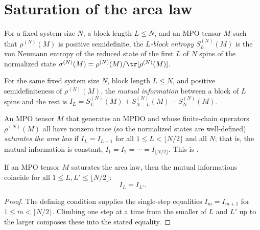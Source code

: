 \section{Saturation of the area law}

\begin{definition}\label{def:block_entropy}
    \leanok
    For a fixed system size $N$, a block length $L\le N$, and an MPO tensor $M$
    such that $\rho^{(N)}(M)$ is positive semidefinite, the \emph{$L$-block entropy}
    $S_L^{(N)}(M)$ is the von Neumann entropy of the reduced state of the first
    $L$ of $N$ spins of the normalized state
    $\sigma^{(N)}(M) = \rho^{(N)}(M) / \tr[\rho^{(N)}(M)]$.
\end{definition}

\begin{definition}\label{def:mutual_info_chain}
    \leanok
    For the same fixed system size $N$, block length $L\le N$, and positive
    semidefiniteness of $\rho^{(N)}(M)$, the \emph{mutual information} between
    a block of $L$ spins and the rest is
    $I_L = S_L^{(N)}(M) + S_{N-L}^{(N)}(M) - S_N^{(N)}(M)$.
\end{definition}

\begin{definition}\label{def:is_sal}
    \leanok
    An MPO tensor $M$ that generates an MPDO and whose finite-chain operators
    $\rho^{(N)}(M)$ all have nonzero trace (so the normalized states are
    well-defined) \emph{saturates the area law} if
    $I_L = I_{L+1}$ for all $1 \le L < \lfloor N/2 \rfloor$ and all $N$; that is,
    the mutual information is constant, $I_1 = I_2 = \cdots = I_{\lfloor N/2 \rfloor}$.
    This is \cite[Definition~4.6, line~811]{Cirac2016MPDO_arXiv}.
\end{definition}

\begin{lemma}
    \label{lem:sal_const}
    \leanok
    If an MPO tensor $M$ saturates the area law, then the mutual informations
    coincide for all $1\le L, L'\le \lfloor N/2\rfloor$:
    \[
        I_L = I_{L'} .
    \]
\end{lemma}
\begin{proof}\leanok
    The defining condition supplies the single-step equalities $I_m = I_{m+1}$ for
    $1\le m<\lfloor N/2\rfloor$. Climbing one step at a time from the smaller of $L$
    and $L'$ up to the larger composes these into the stated equality.
\end{proof}

